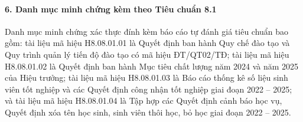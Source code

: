 \paragraph{6. Danh mục minh chứng kèm theo Tiêu chuẩn 8.1}
Danh mục minh chứng xác thực đính kèm báo cáo tự đánh giá tiêu chuẩn bao gồm: tài liệu mã hiệu H8.08.01.01 là Quyết định ban hành Quy chế đào tạo và Quy trình quản lý tiến độ đào tạo có mã hiệu ĐT/QT02/TĐ; tài liệu mã hiệu H8.08.01.02 là Quyết định ban hành Mục tiêu chất lượng năm 2024 và năm 2025 của Hiệu trưởng; tài liệu mã hiệu H8.08.01.03 là Báo cáo thống kê số liệu sinh viên tốt nghiệp và các Quyết định công nhận tốt nghiệp giai đoạn 2022 -- 2025; và tài liệu mã hiệu H8.08.01.04 là Tập hợp các Quyết định cảnh báo học vụ, Quyết định xóa tên học sinh, sinh viên thôi học, bỏ học giai đoạn 2022 -- 2025.
